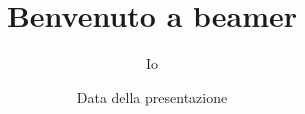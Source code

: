 \documentclass{beamer}
\title{Benvenuto a beamer}
\author{Io}
\institute{Vengo da qui}
\date{Data della presentazione}
\begin{document}
\begin{frame}
\titlepage %
\end{frame}
\end{document}
